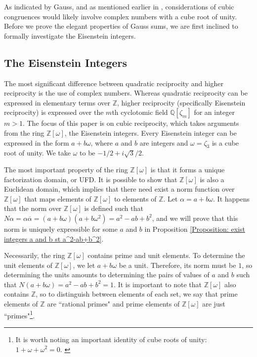 \documentclass[10pt]{amsart}
\newcommand{\QQ}{\mathbb{Q}}
\newcommand{\ZZ}{\mathbb{Z}}
\theoremstyle{plain}
\theoremstyle{definition}
\theoremstyle{remark}
\numberwithin{equation}{section}
\begin{document}
\indent As indicated by Gauss, and as mentioned earlier in \cite{biblioteca1863werke2}, considerations of cubic congruences would likely involve complex numbers with a cube root of unity. Before we prove the elegant properties of Gauss sums, we are first inclined to formally investigate the Eisenstein integers. 

\subsection*{The Eisenstein Integers}
The most significant difference between quadratic reciprocity and higher reciprocity is the use of complex numbers. Whereas quadratic reciprocity can be expressed in elementary terms over $\ZZ$, higher reciprocity (specifically Eisenstein reciprocity) is expressed over the $m$th cyclotomic field $\QQ[\zeta_{m}]$ for an integer $m>1$. The focus of this paper is on cubic reciprocity, which takes arguments from the ring $\ZZ[\omega]$, the Eisenstein integers. Every Eisenstein integer can be expressed in the form $a+b\omega$, where $a$ and $b$ are integers and $\omega=\zeta_{3}$ is a cube root of unity. We take $\omega$ to be $-1/2+i\sqrt{3}/2$.

\indent The most important property of the ring $\ZZ[\omega]$ is that it forms a unique factorization domain, or UFD. It is possible to show that $\ZZ[\omega]$ is also a Euclidean domain, which implies that there need exist a norm function over $\ZZ[\omega]$ that maps elements of $\ZZ[\omega]$ to elements of $\ZZ$. Let $\alpha=a+b\omega$. It happens that the norm over $\ZZ[\omega]$ is defined such that $N\alpha = \alpha\overline{\alpha} = (a+b\omega)(a+b\omega^{2}) = a^{2}-ab+b^{2}$, and we will prove that this norm is uniquely expressible for some $a$ and $b$ in Proposition \ref{Proposition: exist integers a and b st a^2-ab+b^2}.

\indent Necessarily, the ring $\ZZ[\omega]$ contains prime and unit elements. To determine the unit elements of $\ZZ[\omega]$, we let $a+b\omega$ be a unit. Therefore, its norm must be $1$, so determining the units amounts to determining the pairs of values of $a$ and $b$ such that $N(a+b\omega) = a^{2}-ab+b^{2}=1$. It is important to note that $\ZZ[\omega]$ also contains $\ZZ$, so to distinguish between elements of each set, we say that prime elements of $\ZZ$ are ``rational primes" and prime elements of $\ZZ[\omega]$ are just ``primes"\footnote{It is worth noting an important identity of cube roots of unity: $1+\omega+\omega^{2} = 0$. \label{Footnote: sum of cube roots of unity is 0}}.
\end{document}
